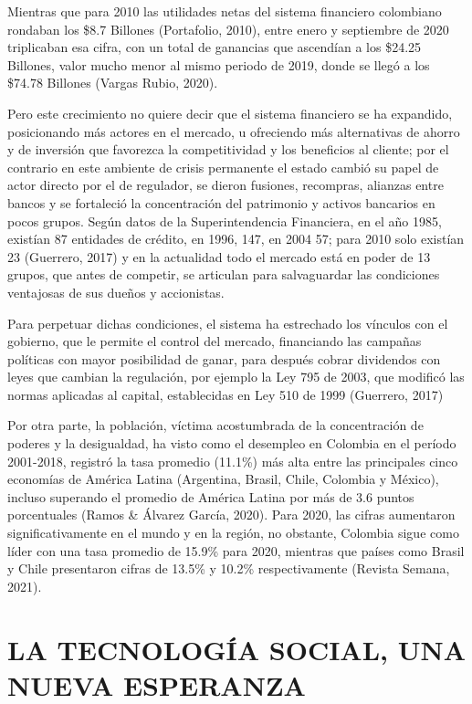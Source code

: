 \documentclass[
]{book}
\begin{document}
Mientras que para 2010 las utilidades netas del sistema financiero colombiano rondaban los \$8.7 Billones (Portafolio, 2010), entre enero y septiembre de 2020 triplicaban esa cifra, con un total de ganancias que ascendían a los \$24.25 Billones, valor mucho menor al mismo periodo de 2019, donde se llegó a los \$74.78 Billones (Vargas Rubio, 2020).

Pero este crecimiento no quiere decir que el sistema financiero se ha expandido, posicionando más actores en el mercado, u ofreciendo más alternativas de ahorro y de inversión que favorezca la competitividad y los beneficios al cliente; por el contrario en este ambiente de crisis permanente el estado cambió su papel de actor directo por el de regulador, se dieron fusiones, recompras, alianzas entre bancos y se fortaleció la concentración del patrimonio y activos bancarios en pocos grupos. Según datos de la Superintendencia Financiera, en el año 1985, existían 87 entidades de crédito, en 1996, 147, en 2004 57; para 2010 solo existían 23 (Guerrero, 2017) y en la actualidad todo el mercado está en poder de 13 grupos, que antes de competir, se articulan para salvaguardar las condiciones ventajosas de sus dueños y accionistas.

Para perpetuar dichas condiciones, el sistema ha estrechado los vínculos con el gobierno, que le permite el control del mercado, financiando las campañas políticas con mayor posibilidad de ganar, para después cobrar dividendos con leyes que cambian la regulación, por ejemplo la Ley 795 de 2003, que modificó las normas aplicadas al capital, establecidas en Ley 510 de 1999 (Guerrero, 2017)

Por otra parte, la población, víctima acostumbrada de la concentración de poderes y la desigualdad, ha visto como el desempleo en Colombia en el período 2001-2018, registró la tasa promedio (11.1\%) más alta entre las principales cinco economías de América Latina (Argentina, Brasil, Chile, Colombia y México), incluso superando el promedio de América Latina por más de 3.6 puntos porcentuales (Ramos \& Álvarez García, 2020). Para 2020, las cifras aumentaron significativamente en el mundo y en la región, no obstante, Colombia sigue como líder con una tasa promedio de 15.9\% para 2020, mientras que países como Brasil y Chile presentaron cifras de 13.5\% y 10.2\% respectivamente (Revista Semana, 2021).

\hypertarget{la-tecnologuxeda-social-una-nueva-esperanza}{%
\chapter{LA TECNOLOGÍA SOCIAL, UNA NUEVA ESPERANZA}\label{la-tecnologuxeda-social-una-nueva-esperanza}}
\end{document}
